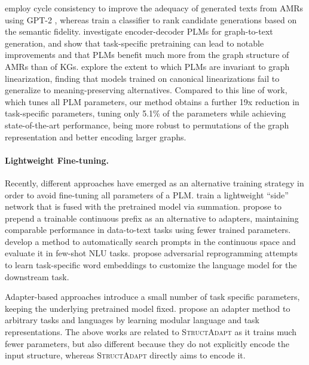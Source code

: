 \documentclass[11pt]{article}
\newcommand{\graphadapter}{{\small\textsc{StructAdapt}}\xspace}
\begin{document}
\citet{mager2020gpttoo} employ cycle consistency to improve the adequacy of generated texts from AMRs using GPT-2 \cite{radford2019language}, whereas \citet{harkous2020text} train a classifier to rank candidate generations based on the semantic fidelity. \citet{ribeiro2020investigating} investigate encoder-decoder PLMs for graph-to-text generation, and show that task-specific pretraining can lead to notable improvements and that PLMs benefit much more from the graph structure of AMRs than of KGs. \citet{hoyle2020promoting} explore the extent to which PLMs are invariant to graph linearization, finding that models trained on canonical linearizations fail to generalize to meaning-preserving alternatives. Compared to this line of work, which tunes all PLM parameters, our method obtains a further 19x reduction in task-specific parameters, tuning only 5.1\% of the parameters while achieving state-of-the-art performance, being more robust to permutations of the graph representation and better encoding larger graphs.

\paragraph{Lightweight Fine-tuning.}
Recently, different approaches have emerged as an alternative training strategy in order to avoid fine-tuning all parameters of a PLM. \citet{sidetuning2019} train a lightweight ``side'' network that is fused with the pretrained model via summation. \citet{li2021prefixtuning} propose to prepend a trainable continuous prefix as an alternative to adapters, maintaining comparable performance in data-to-text tasks using fewer trained parameters. \citet{DBLP:journals/corr/abs-2103-10385} develop a method to automatically search prompts in the continuous space and evaluate it in few-shot NLU tasks. \citet{hambardzumyan-etal-2021-warp} propose adversarial reprogramming attempts to learn task-specific word embeddings to customize the language model for the downstream task.

Adapter-based approaches \cite{pmlr-v97-houlsby19a, NIPS2017_e7b24b11,lauscher-etal-2020-common,pfeiffer-etal-2020-adapterhub, pfeiffer2021adapterfusion} introduce a small number of task specific parameters, keeping the underlying pretrained model fixed. \citet{pfeiffer-etal-2020-mad} propose an adapter method to arbitrary tasks and languages by learning modular language and task representations. The above works are related to \graphadapter as it trains much fewer parameters, but also different because they do not explicitly encode the input structure, whereas \graphadapter directly aims to encode it.
\end{document}
